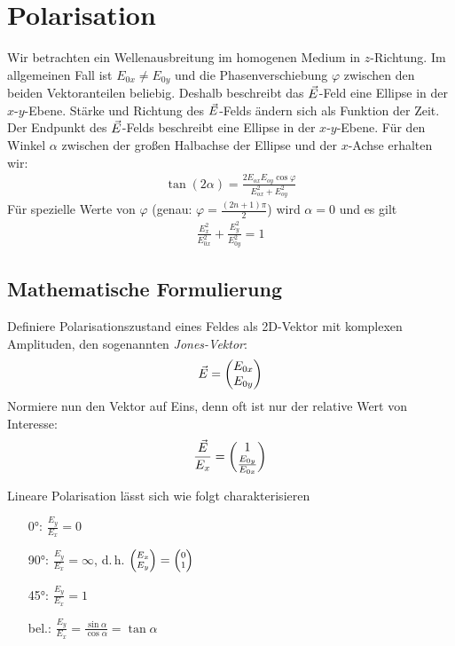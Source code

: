 \chapter{Polarisation}

Wir betrachten ein Wellenausbreitung im homogenen Medium in
$z$-Richtung.
Im allgemeinen Fall ist $E_{0x}\neq E_{0y}$ und die Phasenverschiebung
$\varphi$ zwischen den beiden Vektoranteilen beliebig.
Deshalb beschreibt das $\vec{E}$-Feld eine Ellipse in der
$x$-$y$-Ebene. Stärke und Richtung des $\vec{E}$-Felds ändern sich als
Funktion der Zeit. Der Endpunkt des $\vec{E}$-Felds beschreibt eine
Ellipse in der $x$-$y$-Ebene. Für den Winkel $\alpha$ zwischen der
großen Halbachse der Ellipse und der $x$-Achse erhalten wir:
\begin{gather*}
  \tan(2\alpha) 
  = \frac{2E_{ox}E_{oy}\cos\varphi}{E_{ox}^2 + E_{oy}^2}
\end{gather*}
Für spezielle Werte von $\varphi$ (genau:
$\varphi=\frac{(2n+1)\pi}{2}$) wird $\alpha = 0$ und es gilt 
\begin{gather*}
  \frac{E_x^2}{E_{0x}^2} + \frac{E_y^2}{E_{0y}^2} = 1
\end{gather*}

\section{Mathematische Formulierung}
Definiere Polarisationszustand eines Feldes als 2D-Vektor mit
komplexen Amplituden, den sogenannten
\emph{Jones-Vektor}:
\begin{gather*}
  \vec{E} = \begin{pmatrix}E_{0x}\\E_{0y}\end{pmatrix}
\end{gather*}
Normiere nun den Vektor auf Eins, denn oft ist nur der relative Wert
von Interesse:
\begin{gather*}
  \frac{\vec{E}}{E_x} 
  = \begin{pmatrix}
    1\\\frac{E_{0y}}{E_{0x}}
  \end{pmatrix}
\end{gather*}

Lineare Polarisation lässt sich wie folgt charakterisieren
\begin{itemize}
\item[\ang{0}:] $\frac{E_y}{E_x} = 0$
\item[\ang{90}:] $\frac{E_y}{E_x} = \infty$, d.\,h.
$\scriptsize\begin{pmatrix}E_x\\E_y\end{pmatrix}
= \begin{pmatrix}0\\1\end{pmatrix}$
\item[\ang{45}:] $\frac{E_y}{E_x} = 1$
\item[bel.:] 
  $\frac{E_y}{E_x} = \frac{\sin\alpha}{\cos\alpha} = \tan\alpha$
\end{itemize}

